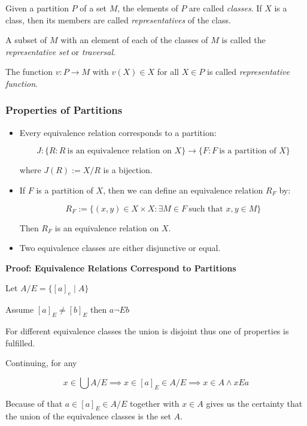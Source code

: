 Given a partition \(P\) of a set \(M\), the elements of \(P\) are called \emph{classes}. 
If \(X\) is a class, then its members are called \emph{representatives} of the class.

A subset of \(M\) with an element of each of the classes of \(M\) is called the \emph{representative set} or \emph{traversal}. 

The function \(v: P \to M\) with \(v(X) \in X\) for all \(X \in P\) is called \emph{representative function}.

\subsubsection{Properties of Partitions}

\begin{itemize}

	\item Every equivalence relation corresponds to a partition:

		  \[
		      J: \{ R : R\ \text{is an equivalence relation on } X\} \to \{ F: F\ \text{is a partition of } X\}
	      \]

	      where \( J(R) := X / R \) is a bijection.

	\item If \(F\) is a partition of \(X\), then we can define an equivalence relation \( R_F \) by:
	      
		  \[
		      R_F := \{ (x, y) \in X \times X : \exists M \in F\ \text{such that } x, y \in M \}
	      \]
	      
		  Then \( R_F \) is an equivalence relation on \(X\).

	\item Two equivalence classes are either disjunctive or equal.

\end{itemize}

\textbf{Proof: Equivalence Relations Correspond to Partitions}

Let \(A / E = \{[a]_e \mid A\}\)

Assume \([a]_E \ne [b]_E\) then \(a \neg E b\)

For different equivalence classes the union is disjoint thus one of properties is fulfilled. 

Continuing, for any 

\[
	x \in \bigcup A/E \implies x \in [a]_E \in A/E \implies x \in A \land x E a 
\]

Because of that \(a \in [a]_E \in A/E\) together with \(x \in A\) gives us the certainty that the union 
of the equivalence classes is the set \(A\).

